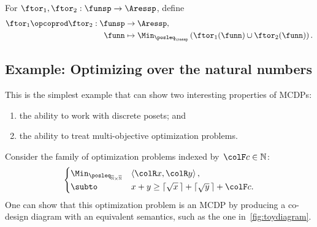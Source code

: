\begin{definition}
\label{def:opcoprod}For $\ftor_{1},\ftor_{2}:\funsp\rightarrow\Aressp$,
define
\begin{align*}
\ftor_{1}\opcoprod\ftor_{2}:\funsp & \rightarrow\Aressp,\\
\funn& \mapsto\Min_{\posleq_{\ressp}}\left(\ftor_{1}(\funn)\cup\ftor_{2}(\funn)\right).
\end{align*}
\end{definition}


\subsection{Example: Optimizing over the natural numbers}

This is the simplest example that can show two interesting properties
of MCDPs: 
\begin{enumerate}
\item the ability to work with discrete posets; and 
\item the ability to treat multi-objective optimization problems.
\end{enumerate}
Consider the family of optimization problems indexed by~${\colF c}\in\mathbb{N}$:
\begin{equation}
\begin{cases}
\Min_{\posleq_{\overline{\mathbb{N}}\times\overline{\mathbb{N}}}} & \left\langle {\colR x},{\colR y}\right\rangle ,\\
\subto & x+y\geq\lceil\sqrt{x}\,\rceil+\lceil\sqrt{y}\,\rceil+{\colF c}.
\end{cases}\label{eq:example-1}
\end{equation}
One can show that this optimization problem is an MCDP by producing
a co-design diagram with an equivalent semantics, such as the one
in~\cref{fig:toydiagram}. 

